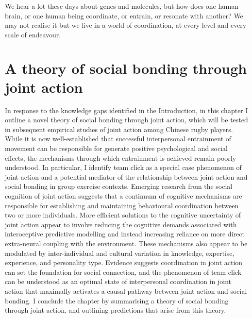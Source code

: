 
\begin{savequote}[8cm]

    We hear a lot these days about genes and molecules, but how does one human brain, or one human being coordinate, or entrain, or resonate with another?  We may not realise it but we live in a world of coordination, at every level and every scale of endeavour.

\end{savequote}




\chapter{\label{chap:theory}A theory of social bonding through joint action}


\minitoc

In response to the knowledge gaps identified in the Introduction, in this chapter I outline a novel theory of social bonding through joint action, which will be tested in subsequent empirical studies of joint action among Chinese rugby players.  While it is now well-established that successful interpersonal entrainment of movement can be responsible for generate positive psychological and social effects, the mechanisms through which entrainment is achieved remain poorly understood.  In particular, I identify team click as a special case phenomenon of joint action and a potential mediator of the relationship between joint action and social bonding in group exercise contexts.  Emerging research from the social cognition of joint action suggests that a continuum of cognitive mechanisms are responsible for establishing and maintaining behavioural coordination between two or more individuals.  More efficient solutions to the cognitive uncertainty of joint action appear to involve reducing the cognitive demands associated with interoceptive predictive modelling and instead increasing reliance on more direct extra-neural coupling with the environment.  These mechanisms also appear to be modulated by inter-individual and cultural variation in knowledge, expertise, experience, and personality type.  Evidence suggests coordination in joint action can set the foundation for social connection, and the phenomenon of team click can be understood as an optimal state of interpersonal coordination in joint action that maximally activates a causal pathway between joint action and social bonding.  I conclude the chapter by summarising a theory of social bonding through joint action, and outlining predictions that arise from this theory.

